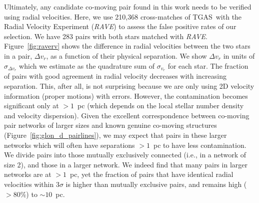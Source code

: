\documentclass[manuscript, letterpaper]{aastex6}
\newcommand{\project}[1]{\textsl{#1}}
\newcommand{\acronym}[1]{{\small{#1}}}
\newcommand{\rave}{\project{\acronym{RAVE}}}
\newcommand{\tgas}{\acronym{TGAS}}
\begin{document}
Ultimately, any candidate co-moving pair found in this work
needs to be verified using radial velocities.
Here, we use 210,368 cross-matches of \tgas\ with
the Radial Velocity Experiment (\rave) to
assess the false positive rates of our selection.
We have 283 pairs with both stars matched with \rave.
Figure~\ref{fig:raverv} shows the difference in radial velocities
between the two stars in a pair, $\Delta v_r$, as a function of their physical separation.
We show $\Delta v_r$ in units of $\sigma_{\Delta v_r}$ which we estimate
as the quadrature sum of $\sigma _{v_r}$ for each star.
The fraction of pairs with good agreement in radial velocity decreases with
increasing separation.
This, after all, is not surprising because we are only using
2D velocity information (proper motions) with errors.
However, the contamination becomes significant only at $>1$~pc
(which depends on the local stellar number density and velocity dispersion).
Given the excellent correspondence between co-moving pair networks of larger sizes
and known genuine co-moving structures (Figure~\ref{fig:glon_d_pairlines}),
we may expect that pairs in these larger networks which will often have
separations $>1$~pc to have less contamination.
We divide pairs into those mutually exclusively connected (i.e., in a network of
size 2), and those in a larger network.
We indeed find that many pairs in larger networks are at $>1$~pc, yet
the fraction of pairs that have identical radial velocities within $3\sigma$ is
higher than mutually exclusive pairs, and remains high ($>80\%$) to $\sim 10$~pc.
\end{document}
